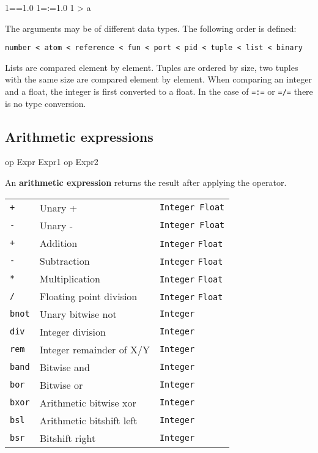 \begin{erlang}
1==1.0              %
1=:=1.0             %
1 > a               %
\end{erlang}

The arguments may be of different data types. The following order is
defined:

\texttt{number < atom < reference < fun < port < pid < tuple < list < binary}

Lists are compared element by element. Tuples are ordered by size, two
tuples with the same size are compared element by element. When
comparing an integer and a float, the integer is first converted to a
float. In the case of \texttt{=:=} or \texttt{=/=} there is no type conversion.


\subsection{Arithmetic expressions}

\begin{erlang}
op Expr
Expr1 op Expr2
\end{erlang}

An \textbf{arithmetic expression} returns the result after applying
the operator.

\begin{center}
\begin{tabular}{|>{\raggedright}p{35pt}|>{\raggedright}p{145pt}|>{\raggedright}p{128pt}|}
\hline
\multicolumn{3}{|p{309pt}|}{Arithmetic operators}\tabularnewline
\hline
\texttt{+}  & Unary +  & \texttt{Integer \textbar{} Float} \tabularnewline
\hline
\texttt{-}  & Unary -  & \texttt{Integer \textbar{} Float}\tabularnewline
\hline
\texttt{+}  & Addition & \texttt{Integer} \textbar{} \texttt{Float}\tabularnewline
\hline
\texttt{-}  & Subtraction & \texttt{Integer} \textbar{} \texttt{Float}\tabularnewline
\hline
\texttt{*}  & Multiplication & \texttt{Integer} \textbar{} \texttt{Float}\tabularnewline
\hline
\texttt{/}  & Floating point division  & \texttt{Integer} \textbar{} \texttt{Float}\tabularnewline
\hline
\texttt{bnot}  & Unary bitwise not  & \texttt{Integer} \tabularnewline
\hline
\texttt{div}  & Integer division  & \texttt{Integer}\tabularnewline
\hline
\texttt{rem}  & Integer remainder of X/Y  & \texttt{Integer} \tabularnewline
\hline
\texttt{band}  & Bitwise and  & \texttt{Integer}\tabularnewline
\hline
\texttt{bor}  & Bitwise or  & \texttt{Integer} \tabularnewline
\hline
\texttt{bxor}  & Arithmetic bitwise xor  & \texttt{Integer}\tabularnewline
\hline
\texttt{bsl}  & Arithmetic bitshift left  & \texttt{Integer} \tabularnewline
\hline
\texttt{bsr}  & Bitshift right  & \texttt{Integer}\tabularnewline
\hline
\end{tabular}
\end{center}

